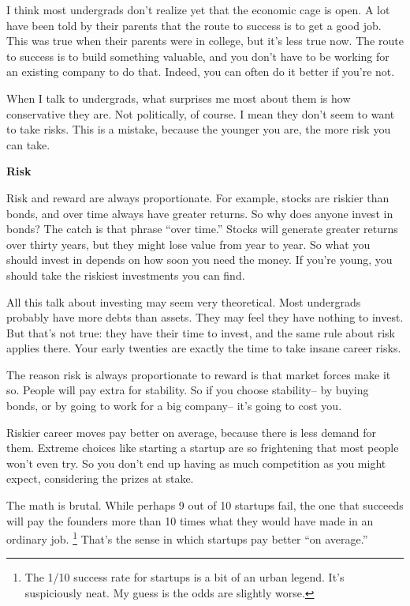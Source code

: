 I think most undergrads don't realize yet that the economic cage is
open. A lot have been told by their parents that the route to success is
to get a good job. This was true when their parents were in college, but
it's less true now. The route to success is to build something valuable,
and you don't have to be working for an existing company to do that.
Indeed, you can often do it better if you're not.

When I talk to undergrads, what surprises me most about them is how
conservative they are. Not politically, of course. I mean they don't
seem to want to take risks. This is a mistake, because the younger you
are, the more risk you can take.

\textbf{Risk}

Risk and reward are always proportionate. For example, stocks are
riskier than bonds, and over time always have greater returns. So why
does anyone invest in bonds? The catch is that phrase ``over time.''
Stocks will generate greater returns over thirty years, but they might
lose value from year to year. So what you should invest in depends on
how soon you need the money. If you're young, you should take the
riskiest investments you can find.

All this talk about investing may seem very theoretical. Most undergrads
probably have more debts than assets. They may feel they have nothing to
invest. But that's not true: they have their time to invest, and the
same rule about risk applies there. Your early twenties are exactly the
time to take insane career risks.

The reason risk is always proportionate to reward is that market forces
make it so. People will pay extra for stability. So if you choose
stability-- by buying bonds, or by going to work for a big company--
it's going to cost you.

Riskier career moves pay better on average, because there is less demand
for them. Extreme choices like starting a startup are so frightening
that most people won't even try. So you don't end up having as much
competition as you might expect, considering the prizes at stake.

The math is brutal. While perhaps 9 out of 10 startups fail, the one
that succeeds will pay the founders more than 10 times what they would
have made in an ordinary job. \footnote{The 1/10 success rate for startups is a bit of an urban legend.
It's suspiciously neat. My guess is the odds are slightly worse.} That's the sense
in which startups pay better ``on average.''

